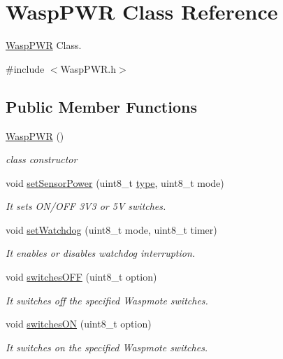 \hypertarget{class_wasp_p_w_r}{}\section{Wasp\+P\+WR Class Reference}
\label{class_wasp_p_w_r}


\hyperlink{class_wasp_p_w_r}{Wasp\+P\+WR} Class.  




{\ttfamily \#include $<$Wasp\+P\+W\+R.\+h$>$}

\subsection*{Public Member Functions}
\begin{DoxyCompactItemize}
\item 
\hyperlink{class_wasp_p_w_r_a353f999c1152f9bc9bb71ac0b9745c61}{Wasp\+P\+WR} ()
\begin{DoxyCompactList}\small\item\em class constructor \end{DoxyCompactList}\item 
void \hyperlink{class_wasp_p_w_r_ad7bd7321ba187fb141ac5798709a88ae}{set\+Sensor\+Power} (uint8\+\_\+t \hyperlink{_sd_fat_structs_8h_a1d127017fb298b889f4ba24752d08b8e}{type}, uint8\+\_\+t mode)
\begin{DoxyCompactList}\small\item\em It sets O\+N/\+O\+FF 3\+V3 or 5V switches. \end{DoxyCompactList}\item 
void \hyperlink{class_wasp_p_w_r_a4024f9714103d955a0ca20b7b0977315}{set\+Watchdog} (uint8\+\_\+t mode, uint8\+\_\+t timer)
\begin{DoxyCompactList}\small\item\em It enables or disables watchdog interruption. \end{DoxyCompactList}\item 
void \hyperlink{class_wasp_p_w_r_a270674b3518448624b5b48ceaea5c734}{switches\+O\+FF} (uint8\+\_\+t option)
\begin{DoxyCompactList}\small\item\em It switches off the specified Waspmote switches. \end{DoxyCompactList}\item 
void \hyperlink{class_wasp_p_w_r_aaca804d8d62c6b1a2c97191d53d646cc}{switches\+ON} (uint8\+\_\+t option)
\begin{DoxyCompactList}\small\item\em It switches on the specified Waspmote switches. \end{DoxyCompactList}\item 

\end{DoxyCompactItemize}
